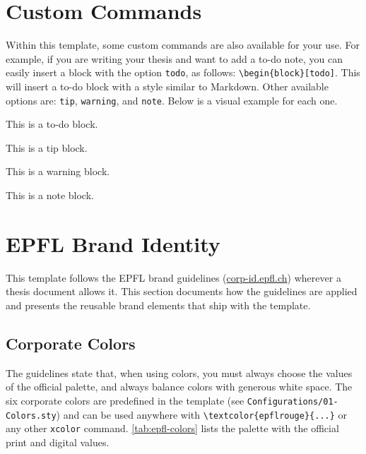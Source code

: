 \section{Custom Commands}
Within this template, some custom commands are also available for your use. For example, if you are writing your thesis and want to add a to-do note, you can easily insert a block with the option \verb|todo|, as follows: \verb|\begin{block}[todo]|. This will insert a to-do block with a style similar to Markdown. Other available options are: \verb|tip|, \verb|warning|, and \verb|note|. Below is a visual example for each one.

\vspace{.875em}
\begin{tcbraster}[
    raster columns=2, 
    raster equal height, 
    nobeforeafter, 
    raster column skip=1cm
]
\begin{block}[todo]
    This is a to-do block.
\end{block}
\begin{block}[tip]
    This is a tip block.
\end{block}
\end{tcbraster}

\begin{tcbraster}[
    raster columns=2, 
    raster equal height, 
    nobeforeafter, 
    raster column skip=1cm
]
\begin{block}[warning]
    This is a warning block.
\end{block}
\begin{block}[note]
    This is a note block.
\end{block}
\end{tcbraster}
\vspace{.875em}

\section{EPFL Brand Identity}
\label{sec:brand-identity}
This template follows the EPFL brand guidelines (\href{https://corp-id.epfl.ch}{corp-id.epfl.ch}) wherever a thesis document allows it. This section documents how the guidelines are applied and presents the reusable brand elements that ship with the template.

\subsection{Corporate Colors}
\label{sec:brand-colors}
The guidelines state that, when using colors, you must always choose the values of the official palette, and always balance colors with generous white space. The six corporate colors are predefined in the template (see \texttt{Configurations/01-Colors.sty}) and can be used anywhere with \verb|\textcolor{epflrouge}{...}| or any other \texttt{xcolor} command. \autoref{tab:epfl-colors} lists the palette with the official print and digital values.

